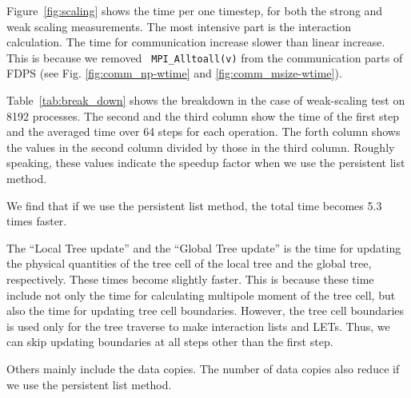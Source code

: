 \documentclass[]{pasj01}
\begin{document}
Figure~\ref{fig:scaling} shows the time per one timestep, for both the
strong and weak scaling measurements. The most intensive part is the
interaction calculation. The time for communication increase slower
than linear increase. This is because we removed {\tt
  MPI\_Alltoall(v)} from the communication parts of FDPS (see
Fig. \ref{fig:comm_np-wtime} and \ref{fig:comm_msize-wtime}).

Table~\ref{tab:break_down} shows the breakdown in the case of
weak-scaling test on 8192 processes. The second and the third column
show the time of the first step and the averaged time over 64 steps
for each operation. The forth column shows the values in the second
column divided by those in the third column. Roughly speaking, these
values indicate the speedup factor when we use the persistent list
method.

We find that if we use the persistent list method, the total time
becomes 5.3 times faster.

The ``Local Tree update'' and the ``Global Tree update'' is the time
for updating the physical quantities of the tree cell of the local
tree and the global tree, respectively. These times become slightly
faster. This is because these time include not only the time for
calculating multipole moment of the tree cell, but also the time for
updating tree cell boundaries. However, the tree cell boundaries is
used only for the tree traverse to make interaction lists and
LETs. Thus, we can skip updating boundaries at all steps other than
the first step.

Others mainly include the data copies. The number of data copies also
reduce if we use the persistent list method.
\end{document}
